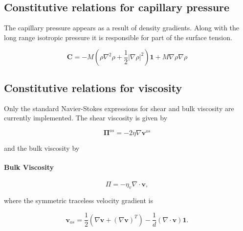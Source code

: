 \subsection{Constitutive relations for capillary pressure}
The capillary pressure appears as a result of density gradients. Along with the
long range isotropic pressure it is responsible for part of the surface
tension.

\begin{equation}
\label{gradient_pressure}
\mathbold{C} = -M \left(   \rho \nabla^{2} \rho + \frac{1}{2} | \nabla \rho | ^{2} \right) \mathbold{1} + M \nabla \rho \nabla \rho
\end{equation}


\subsection{Constitutive relations for viscosity}
Only the standard Navier-Stokes expressions for shear and bulk viscosity are
currently implemented. The shear viscosity is given by

\begin{equation}
\label{shear_viscosity_constitutive}
\mathbold{\Pi}^{os} = -2 \eta \nabla \mathbold{v}^{os}
\end{equation}

and the bulk viscosity by

\paragraph{Bulk Viscosity}
\begin{equation}
\label{bulk_viscosity_constitutive}
\Pi = -\eta_{v} \nabla \cdot \mathbold{v},
\end{equation}

where the symmetric traceless velocity gradient is

\begin{equation}
\label{grad_v_os}
\mathbold{v}_{os} = \frac{1}{2} \left(\nabla \mathbold{v} + (\nabla \mathbold{v})^{T}\right) 
- \frac{1}{d} \left(\nabla \cdot \mathbold{v} \right) \mathbold{1}.
\end{equation}


